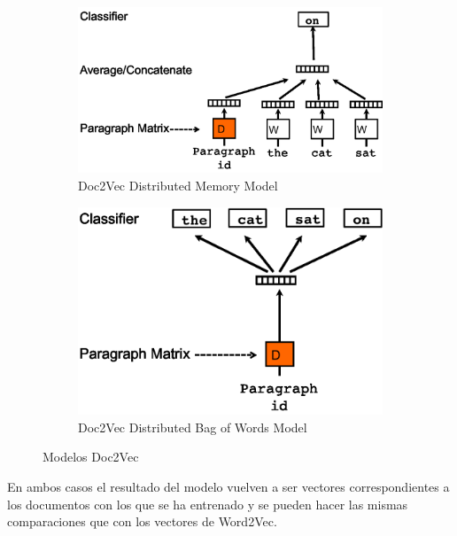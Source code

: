 \documentclass[withindex, glossary]{cam-thesis}
\begin{document}
\begin{figure}[!htbp]
    \centering
    \begin{subfigure}[t]{0.4\textwidth}
        \centering
        \includegraphics[width=\textwidth]{./figures/distributed_memory_model.pdf}
        \caption{Doc2Vec Distributed Memory Model}\label{d2v-dmm}
    \end{subfigure}
    \begin{subfigure}[t]{0.4\textwidth}
        \centering
        \includegraphics[width=\textwidth]{./figures/distributed_bag_of_words.pdf}
        \caption{Doc2Vec Distributed Bag of Words Model}\label{d2v-dbow}
    \end{subfigure}
    \caption{Modelos Doc2Vec}
\end{figure}

En ambos casos el resultado del modelo vuelven a ser vectores correspondientes a los documentos con los que se ha entrenado y se pueden hacer las mismas comparaciones que con los vectores de Word2Vec.
\end{document}
